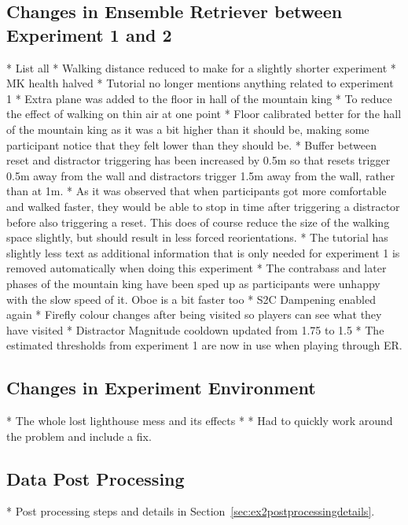 \subsection{Changes in Ensemble Retriever between Experiment 1 and 2}
   * List all
   * Walking distance reduced to make for a slightly shorter experiment
   * MK health halved
   * Tutorial no longer mentions anything related to experiment 1
   * Extra plane was added to the floor in hall of the mountain king
      * To reduce the effect of walking on thin air at one point
   * Floor calibrated better for the hall of the mountain king as it was a bit higher than it should be, making some participant notice that they felt lower than they should be. 
   * Buffer between reset and distractor triggering has been increased by 0.5m so that resets trigger 0.5m away from the wall and distractors trigger 1.5m away from the wall, rather than at 1m. 
      * As it was observed that when participants got more comfortable and walked faster, they would be able to stop in time after triggering a distractor before also triggering a reset. This does of course reduce the size of the walking space slightly, but should result in less forced reorientations.
   * The tutorial has slightly less text as additional information that is only needed for experiment 1 is removed automatically when doing this experiment
   * The contrabass and later phases of the mountain king have been sped up as participants were unhappy with the slow speed of it. Oboe is a bit faster too
   * S2C Dampening enabled again
   * Firefly colour changes after being visited so players can see what they have visited 
   * Distractor Magnitude cooldown updated from 1.75 to 1.5
   * The estimated thresholds from experiment 1 are now in use when playing through ER. 


\subsection{Changes in Experiment Environment}\label{sec:ex2environmentchanges}
   * The whole lost lighthouse mess and its effects
   * 
   * Had to quickly work around the problem and include a fix. 
   
\subsection{Data Post Processing}
* Post processing steps and details in Section~\ref{sec:ex2postprocessingdetails}.